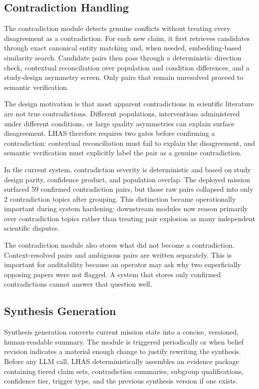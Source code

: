 \documentclass[manuscript,screen,review]{jair}
\begin{document}
\subsection{Contradiction Handling}
The contradiction module detects genuine conflicts without treating every disagreement as a contradiction. For each new claim, it first retrieves candidates through exact canonical entity matching and, when needed, embedding-based similarity search. Candidate pairs then pass through a deterministic direction check, contextual reconciliation over population and condition differences, and a study-design asymmetry screen. Only pairs that remain unresolved proceed to semantic verification.

The design motivation is that most apparent contradictions in scientific literature are not true contradictions. Different populations, interventions administered under different conditions, or large quality asymmetries can explain surface disagreement. LHAS therefore requires two gates before confirming a contradiction: contextual reconciliation must fail to explain the disagreement, and semantic verification must explicitly label the pair as a genuine contradiction.

In the current system, contradiction severity is deterministic and based on study design parity, confidence product, and population overlap. The deployed mission surfaced 59 confirmed contradiction pairs, but those raw pairs collapsed into only 2 contradiction topics after grouping. This distinction became operationally important during system hardening: downstream modules now reason primarily over contradiction topics rather than treating pair explosion as many independent scientific disputes.

The contradiction module also stores what did not become a contradiction. Context-resolved pairs and ambiguous pairs are written separately. This is important for auditability because an operator may ask why two superficially opposing papers were not flagged. A system that stores only confirmed contradictions cannot answer that question well.

\subsection{Synthesis Generation}
Synthesis generation converts current mission state into a concise, versioned, human-readable summary. The module is triggered periodically or when belief revision indicates a material enough change to justify rewriting the synthesis. Before any LLM call, LHAS deterministically assembles an evidence package containing tiered claim sets, contradiction summaries, subgroup qualifications, confidence tier, trigger type, and the previous synthesis version if one exists.
\end{document}

